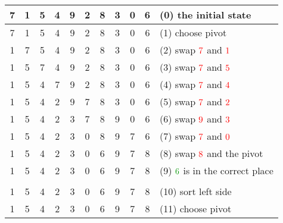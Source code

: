\begin{center}
    \begin{longtable}{ | c | c | c | c | c | c | c | c | c | c || l | }
        \hline
        7 & 1 & 5 & 4 & 9 & 2 & 8 & 3 & 0 & 6 &(0) the initial state \\ \hline
        7 & 1 & 5 & 4 & 9 & 2 & 8 & 3 & 0 &\cellcolor{LightCyan}6 &(1) choose \color{cyan}pivot\\ \hline %
        \color{red}1 & \color{red}7 & 5 & 4 & 9 & 2 & 8 & 3 & 0 &\cellcolor{LightCyan}6 &(2) swap \(\color{red}7\) and \(\color{red}1\)\\ \hline %
        1 & \color{red}5 & \color{red}7 & 4 & 9 & 2 & 8 & 3 & 0 &\cellcolor{LightCyan}6 &(3) swap \(\color{red}7\) and \(\color{red}5\)\\ \hline %
        1 & 5 & \color{red}4 & \color{red}7 & 9 & 2 & 8 & 3 & 0 &\cellcolor{LightCyan}6 &(4) swap \(\color{red}7\) and \(\color{red}4\)\\ \hline %
        1 & 5 & 4 & \color{red}2 & 9 & \color{red} 7 & 8 & 3 & 0 &\cellcolor{LightCyan}6 &(5) swap \(\color{red}7\) and \(\color{red}2\)\\ \hline %
        1 & 5 & 4 & 2 & \color{red}3 & 7 & 8 & \color{red}9 & 0 &\cellcolor{LightCyan}6 &(6) swap \(\color{red}9\) and \(\color{red}3\)\\ \hline %
        1 & 5 & 4 & 2 & 3 & \color{red}0 & 8 & 9 & \color{red}7 &\cellcolor{LightCyan}6 &(7) swap \(\color{red}7\) and \(\color{red}0\)\\ \hline %
        1 & 5 & 4 & 2 & 3 & 0 & \color{cyan}6 & 9 & 7 & \color{red}8 &(8) swap \(\color{red}8\) and the {\color{cyan}pivot}\\ \hline %
        1 & 5 & 4 & 2 & 3 & 0 & \cellcolor{LightGreen}6 & 9 & 7 & 8 &(9) \(\color{green}6\) is in the correct place \\ \hhline{===========}
        \multicolumn{11}{ | c | }{partition the sequence into \((1, 5, 4, 2, 3, 0)\) and \((9, 7, 8)\)} \\ \hhline{===========}
        \cellcolor{Amber}1 & \cellcolor{Amber}5 & \cellcolor{Amber}4 & \cellcolor{Amber}2 & \cellcolor{Amber}3 & \cellcolor{Amber}0 & \cellcolor{LightGreen}6 & \cellcolor{LightGrey}9 & \cellcolor{LightGrey}7 & \cellcolor{LightGrey}8 &(10) sort {\color{DarkOrange}left side} \\ \hline
        1 & 5 & 4 & 2 & 3 & \cellcolor{LightCyan}0 & \cellcolor{LightGreen}6 & \cellcolor{LightGrey}9 & \cellcolor{LightGrey}7 & \cellcolor{LightGrey}8 &(11) choose {\color{cyan}pivot} \\ \hline

\end{longtable}
\end{center}
